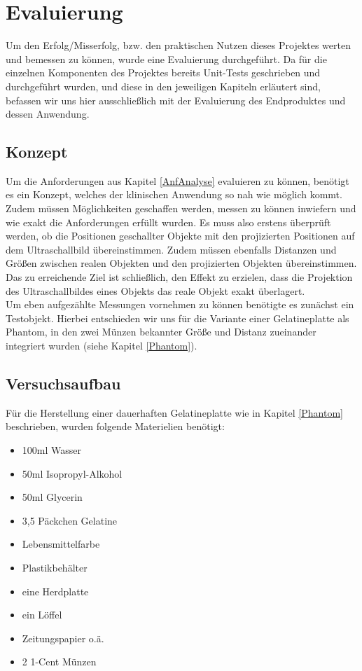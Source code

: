 \chapter{Evaluierung} \label{Evaluierung}
Um den Erfolg/Misserfolg, bzw. den praktischen Nutzen dieses Projektes werten und bemessen zu können, wurde eine Evaluierung durchgeführt. Da für die einzelnen Komponenten des Projektes bereits Unit-Tests geschrieben und durchgeführt wurden, und diese in den jeweiligen Kapiteln erläutert sind, befassen wir uns hier ausschließlich mit der Evaluierung des Endproduktes und dessen Anwendung.
\section{Konzept}
Um die Anforderungen aus Kapitel \ref{AnfAnalyse} evaluieren zu können, benötigt es ein Konzept, welches der klinischen Anwendung so nah wie möglich kommt. Zudem müssen Möglichkeiten geschaffen werden, messen zu können inwiefern und wie exakt die Anforderungen erfüllt wurden. Es muss also erstens überprüft werden, ob die Positionen geschallter Objekte mit den projizierten Positionen auf dem Ultraschallbild übereinstimmen. Zudem müssen ebenfalls Distanzen und Größen zwischen realen Objekten und den projizierten Objekten übereinstimmen. Das zu erreichende Ziel ist schließlich, den Effekt zu erzielen, dass die Projektion des Ultraschallbildes eines Objekts das reale Objekt exakt überlagert. 
\\
Um eben aufgezählte Messungen vornehmen zu können benötigte es zunächst ein Testobjekt. Hierbei entschieden wir uns für die Variante einer Gelatineplatte als Phantom, in den zwei Münzen bekannter Größe und Distanz zueinander integriert wurden (siehe Kapitel \ref{Phantom}). 
\clearpage
\section{Versuchsaufbau} \label{Versuchsaufbau}
Für die Herstellung einer dauerhaften Gelatineplatte wie in Kapitel \ref{Phantom} beschrieben, wurden folgende Materielien benötigt:
\begin{itemize}
\item 100ml Wasser
\item 50ml Isopropyl-Alkohol
\item 50ml Glycerin
\item 3,5 Päckchen Gelatine
\item Lebensmittelfarbe
\item Plastikbehälter
\item eine Herdplatte
\item ein Löffel
\item Zeitungspapier o.ä.
\item 2 1-Cent Münzen
\end{itemize}

